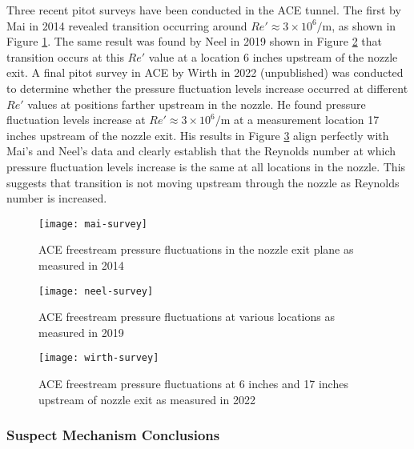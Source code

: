 Three recent pitot surveys have been conducted in the ACE tunnel. The first by Mai in 2014 \cite{mai-dis} revealed transition occurring around $Re' \approx 3 \times 10^6/\mathrm{m}$, as shown in Figure \ref{fig:mai-survey}. The same result was found by Neel in 2019 \cite{neel-dis} shown in Figure \ref{fig:neel-survey} that transition occurs at this $Re'$ value at a location 6 inches upstream of the nozzle exit. A final pitot survey in ACE by Wirth in 2022 (unpublished) was conducted to determine whether the pressure fluctuation levels increase occurred at different $Re'$ values at positions farther upstream in the nozzle. He found pressure fluctuation levels increase at $Re' \approx 3 \times 10^6/\mathrm{m}$ at a measurement location 17 inches upstream of the nozzle exit. His results in Figure \ref{fig:wirth-survey} align perfectly with Mai's and Neel's data and clearly establish that the Reynolds number at which pressure fluctuation levels increase is the same at all locations in the nozzle. This suggests that transition is not moving upstream through the nozzle as Reynolds number is increased.

\begin{figure}[ht!]
    \centering
    \texttt{[image: mai-survey]}
    \caption[ACE freestream pressure fluctuations in the nozzle exit plane as measured in 2014]{ACE freestream pressure fluctuations in the nozzle exit plane as measured in 2014 \cite{mai-dis}}
    \label{fig:mai-survey}
\end{figure}

\begin{figure}[ht!]
    \centering
    \texttt{[image: neel-survey]}
    \caption[ACE freestream pressure fluctuations at various locations as measured ii 2019]{ACE freestream pressure fluctuations at various locations as measured in 2019 \cite{neel-dis}}
    \label{fig:neel-survey}
\end{figure}

\begin{figure}[ht!]
    \centering
    \texttt{[image: wirth-survey]}
    \caption{ACE freestream pressure fluctuations at 6 inches and 17 inches upstream of nozzle exit as measured in 2022}
    \label{fig:wirth-survey}
\end{figure}

\subsubsection*{Suspect Mechanism Conclusions}

